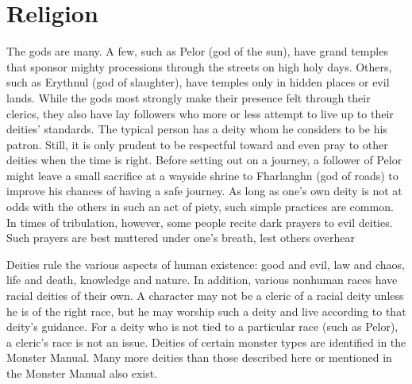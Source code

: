\chapter{Religion}

The gods are many. A few, such as Pelor (god of the sun), have grand temples that sponsor mighty processions through the streets on high holy days. Others, such as Erythnul (god of slaughter), have temples only in hidden places or evil lands. While the gods most strongly make their presence felt through their clerics, they also have lay followers who more or less attempt to live up to their deities’ standards. The typical person has a deity whom he considers to be his patron. Still, it is only prudent to be respectful toward and even pray to other deities when the time is right. Before setting out on a journey, a follower of Pelor might leave a small sacrifice at a wayside shrine to Fharlanghn (god of roads) to improve his chances of having a safe journey. As long as one’s own deity is not at odds with the others in such an act of piety, such simple practices are common. In times of tribulation, however, some people recite dark prayers to evil deities. Such prayers are best muttered under one’s breath, lest others overhear

Deities rule the various aspects of human existence: good and evil, law and chaos, life and death, knowledge and nature. In addition, various nonhuman races have racial deities of their own. A character may not be a cleric of a racial deity unless he is of the right race, but he may worship such a deity and live according to that deity’s guidance. For a deity who is not tied to a particular race (such as Pelor), a cleric’s race is not an issue. Deities of certain monster types are identified in the Monster Manual. Many more deities than those described here or mentioned in the Monster Manual also exist.


\pagebreak

\pagebreak